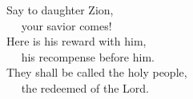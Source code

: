 
\lettrine{S}{}ay to daughter Zion,\\
   your savior comes!\\
Here is his reward with him,\\
   his recompense before him.\\
They shall be called the holy people,\\
   the redeemed of the Lord.